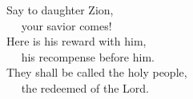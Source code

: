 
\lettrine{S}{}ay to daughter Zion,\\
   your savior comes!\\
Here is his reward with him,\\
   his recompense before him.\\
They shall be called the holy people,\\
   the redeemed of the Lord.